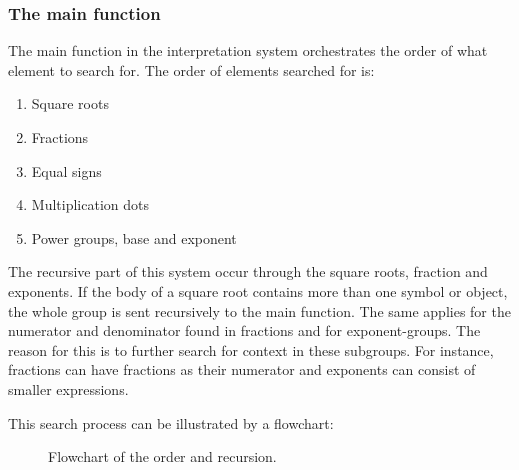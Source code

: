 \subsubsection{The main function}
The main function in the interpretation system orchestrates the order of what element to search for. The order of elements searched for is:

\begin{enumerate}
    \setlength\itemsep{0.3em}
    \item Square roots
    \item Fractions
    \item Equal signs
    \item Multiplication dots
    \item Power groups, base and exponent
\end{enumerate}

The recursive part of this system occur through the square roots, fraction and exponents. If the body of a square root contains more than one symbol or object, the whole group is sent recursively to the main function. The same applies for the numerator and denominator found in fractions and for exponent-groups. The reason for this is to further search for context in these subgroups. For instance, fractions can have fractions as their numerator and exponents can consist of smaller expressions. 

This search process can be illustrated by a flowchart:

\begin{figure}[H]
\centering
    \caption{Flowchart of the order and recursion.}

\label{fig:interpretation_flowchart}
\end{figure}

